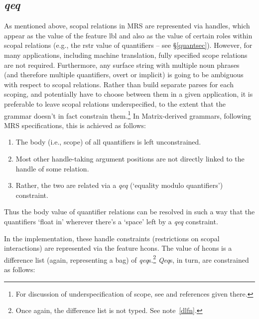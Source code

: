 \documentclass[12pt]{article}
\newcommand{\es}{\enumsentence}
\newcommand{\fn}{\footnote}
\begin{document}
\subsection{{\it qeq}}
\label{qeqsec}

As mentioned above, scopal relations in MRS are represented via
handles, which appear as the value of the feature {\sc lbl} and also
as the value of certain roles within scopal relations (e.g., the {\sc
rstr} value of quantifiers -- see \S\ref{quantsec}).
However, for many applications, including machine translation, fully
specified scope relations are not required.  Furthermore, any surface
string with multiple noun phrases (and therefore multiple quantifiers,
overt or implicit) is going to be ambiguous with respect to scopal
relations.  Rather than build separate parses for each scoping, and
potentially have to choose between them in a given application, it is
preferable to leave scopal relations underspecified, to the extent
that the grammar doesn't in fact constrain them.\fn{For discussion of
underspecification of scope, see  and
references given there.}  In Matrix-derived grammars, following MRS
specifications, this is achieved as follows:

\begin{enumerate}
\item The {\sc body} (i.e., scope) of all quantifiers is left unconstrained.
\item Most other handle-taking argument positions are not directly linked
to the handle of some relation.
\item Rather, the two are related via a {\it qeq} (`equality modulo
quantifiers') constraint.
\end{enumerate}

\noindent
Thus the {\sc body} value of quantifier relations can be resolved in
such a way that the quantifiers `float in' wherever there's a `space'
left by a {\it qeq} constraint.

In the implementation, these handle constraints (restrictions on scopal
interactions) are represented via the feature {\sc
hcons}.  The value of {\sc hcons} is a difference list (again,
representing a bag) of {\it qeq}s.\fn{Once again, the difference list
is not typed.  See note~\ref{dlfn}.}  {\it Qeq}s, in turn, are
constrained as follows:

\es{
\begin{avm}
{\it qeq}: \[ harg & handle\\
	      larg & handle \]
\end{avm}
}
\end{document}
